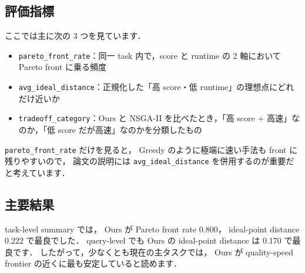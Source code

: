 \documentclass[a4paper,11pt]{article}
\begin{document}
\subsection*{評価指標}
ここでは主に次の 3 つを見ています．
\begin{itemize}
    \item \texttt{pareto\_front\_rate}：同一 task 内で，score と runtime の 2 軸において Pareto front に乗る頻度
    \item \texttt{avg\_ideal\_distance}：正規化した「高 score・低 runtime」の理想点にどれだけ近いか
    \item \texttt{tradeoff\_category}：Ours と NSGA-II を比べたとき，「高 score + 高速」なのか，「低 score だが高速」なのかを分類したもの
\end{itemize}

\texttt{pareto\_front\_rate} だけを見ると，
Greedy のように極端に速い手法も front に残りやすいので，
論文の説明には \texttt{avg\_ideal\_distance} を併用するのが重要だと考えています．

\subsection*{主要結果}
task-level summary では，
Ours が Pareto front rate 0.800，
ideal-point distance 0.222 で最良でした．
query-level でも Ours の ideal-point distance は 0.170 で最良です．
したがって，少なくとも現在の主タスクでは，
Ours が quality-speed frontier の近くに最も安定していると読めます．

\begin{table}[H]
    \centering
    \small
    \caption{実験3の quality-speed balance 要約（task-level）}
\end{table}
\end{document}
